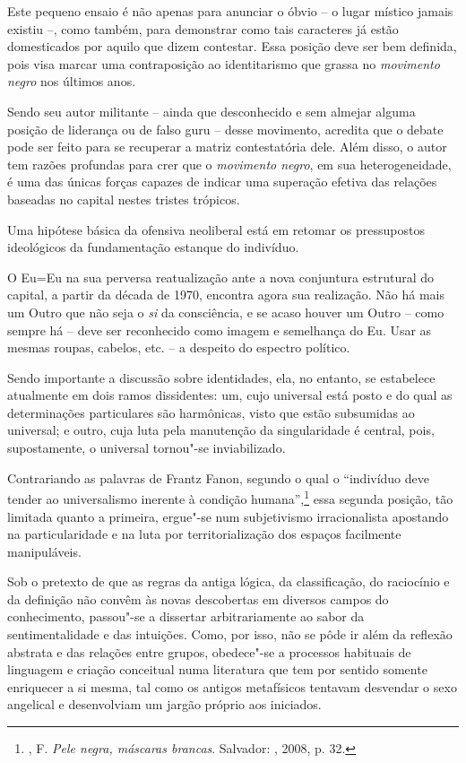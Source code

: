 Este pequeno ensaio é não apenas para anunciar o óbvio -- o lugar
místico jamais existiu --, como também, para demonstrar como tais
caracteres já estão domesticados por aquilo que dizem contestar. Essa
posição deve ser bem definida, pois visa marcar uma contraposição ao
identitarismo que grassa no \emph{movimento negro} nos últimos anos.

Sendo seu autor militante -- ainda que desconhecido e sem almejar alguma
posição de liderança ou de falso guru -- desse movimento, acredita que o
debate pode ser feito para se recuperar a matriz contestatória dele.
Além disso, o autor tem razões profundas para crer que o \emph{movimento
negro}, em sua heterogeneidade, é uma das únicas forças capazes de
indicar uma superação efetiva das relações baseadas no capital nestes
tristes trópicos.

Uma hipótese básica da ofensiva neoliberal está em retomar os
pressupostos ideológicos da fundamentação estanque do indivíduo.

O Eu=Eu na sua perversa reatualização ante a nova conjuntura estrutural
do capital, a partir da década de 1970, encontra agora sua realização.
Não há mais um Outro que não seja o \emph{si} da consciência, e se acaso
houver um Outro -- como sempre há -- deve ser reconhecido como imagem e
semelhança do Eu. Usar as mesmas roupas, cabelos, etc. -- a despeito do
espectro político.

Sendo importante a discussão sobre identidades, ela, no entanto, se
estabelece atualmente em dois ramos dissidentes: um, cujo universal está
posto e do qual as determinações particulares são harmônicas, visto que
estão subsumidas ao universal; e outro, cuja luta pela manutenção da
singularidade é central, pois, supostamente, o universal tornou"-se
inviabilizado.

Contrariando as palavras de Frantz Fanon, segundo o qual o ``indivíduo
deve tender ao universalismo inerente à condição humana'',\footnote{,
  F. \emph{Pele negra, máscaras brancas}. Salvador: , 2008, p. 32.}
essa segunda posição, tão limitada quanto a primeira, ergue"-se num
subjetivismo irracionalista apostando na particularidade e na luta por
territorialização dos espaços facilmente manipuláveis.

Sob o pretexto de que as regras da antiga lógica, da classificação, do
raciocínio e da definição não convêm às novas descobertas em diversos
campos do conhecimento, passou"-se a dissertar arbitrariamente ao sabor
da sentimentalidade e das intuições. Como, por isso, não se pôde ir além
da reflexão abstrata e das relações entre grupos, obedece"-se a processos
habituais de linguagem e criação conceitual numa literatura que tem por
sentido somente enriquecer a si mesma, tal como os antigos metafísicos
tentavam desvendar o sexo angelical e desenvolviam um jargão próprio aos
iniciados.

